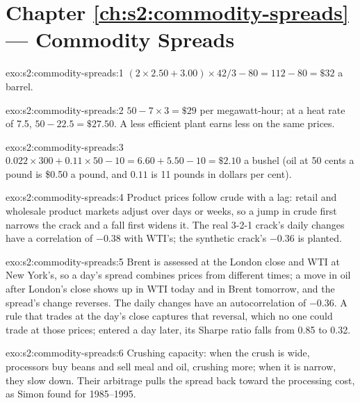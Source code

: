 \section*{Chapter \ref{ch:s2:commodity-spreads} --- Commodity Spreads}

\begin{solution}{exo:s2:commodity-spreads:1}
$(2 \times 2.50 + 3.00) \times 42 / 3 - 80 = 112 - 80 = \$32$ a barrel.
\end{solution}

\begin{solution}{exo:s2:commodity-spreads:2}
$50 - 7 \times 3 = \$29$ per megawatt-hour; at a heat rate of 7.5, $50 - 22.5 = \$27.50$. A less efficient plant earns less on the same prices.
\end{solution}

\begin{solution}{exo:s2:commodity-spreads:3}
$0.022 \times 300 + 0.11 \times 50 - 10 = 6.60 + 5.50 - 10 = \$2.10$ a bushel (oil at 50 cents a pound is \$0.50 a pound, and $0.11$ is 11
pounds in dollars per cent).
\end{solution}

\begin{solution}{exo:s2:commodity-spreads:4}
Product prices follow crude with a lag: retail and wholesale product markets adjust over days or weeks, so a jump in crude first narrows the crack and
a fall first widens it. The real 3-2-1 crack's daily changes have a correlation of $-0.38$ with WTI's; the synthetic crack's $-0.36$ is planted.
\end{solution}

\begin{solution}{exo:s2:commodity-spreads:5}
Brent is assessed at the London close and WTI at New York's, so a day's spread combines prices from different times; a move in oil after London's
close shows up in WTI today and in Brent tomorrow, and the spread's change reverses. The daily changes have an autocorrelation of $-0.36$. A rule
that trades at the day's close captures that reversal, which no one could trade at those prices; entered a day later, its Sharpe ratio falls from 0.85
to 0.32.
\end{solution}

\begin{solution}{exo:s2:commodity-spreads:6}
Crushing capacity: when the crush is wide, processors buy beans and sell meal and oil, crushing more; when it is narrow, they slow down. Their
arbitrage pulls the spread back toward the processing cost, as Simon found for 1985--1995.
\end{solution}


